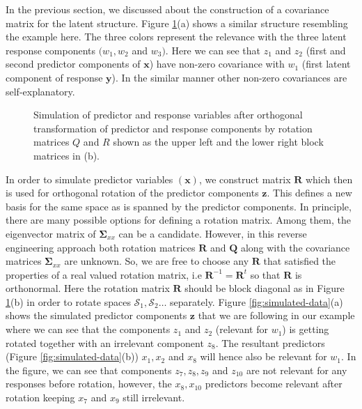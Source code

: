 \documentclass[review]{elsarticle}
\theoremstyle{definition}
\theoremstyle{definition}
\theoremstyle{remark}
\begin{document}
In the previous section, we discussed about the construction of a
covariance matrix for the latent structure. Figure
\ref{fig:cov-plot-print}(a) shows a similar structure resembling the
example here. The three colors represent the relevance with the three
latent response components \((w_1, w_2\) and \(w_3)\). Here we can see
that \(z_{1}\) and \(z_{2}\) (first and second predictor components of
\(\mathbf{x}\)) have non-zero covariance with \(w_1\) (first latent
component of response \(\mathbf{y}\)). In the similar manner other
non-zero covariances are self-explanatory.

\begin{figure}[!htb]
\caption{Simulation of predictor and response variables after orthogonal transformation of predictor and response components by rotation matrices $Q$ and $R$ shown as the upper left and the lower right block matrices in (b).}\label{fig:cov-plot-print}
\end{figure}

In order to simulate predictor variables \((\mathbf{x})\), we construct
matrix \(\mathbf{R}\) which then is used for orthogonal rotation of the
predictor components \(\mathbf{z}\). This defines a new basis for the
same space as is spanned by the predictor components. In principle,
there are many possible options for defining a rotation matrix. Among
them, the eigenvector matrix of \(\boldsymbol{\Sigma}_{xx}\) can be a
candidate. However, in this reverse engineering approach both rotation
matrices \(\mathbf{R}\) and \(\mathbf{Q}\) along with the covariance
matrices \(\boldsymbol{\Sigma}_{xx}\) are unknown. So, we are free to
choose any \(\mathbf{R}\) that satisfied the properties of a real valued
rotation matrix, i.e \(\mathbf{R}^{-1} = \mathbf{R}^t\) so that
\(\mathbf{R}\) is orthonormal. Here the rotation matrix \(\mathbf{R}\)
should be block diagonal as in Figure \ref{fig:cov-plot-print}(b) in
order to rotate spaces \(\mathcal{S}_1, \mathcal{S}_2 \ldots\)
separately. Figure \ref{fig:simulated-data}(a) shows the simulated
predictor components \(\mathbf{z}\) that we are following in our example
where we can see that the components \(z_{1}\) and \(z_{2}\) (relevant
for \(w_1\)) is getting rotated together with an irrelevant component
\(z_{8}\). The resultant predictors (Figure \ref{fig:simulated-data}(b))
\(x_{1}, x_{2}\) and \(x_{8}\) will hence also be relevant for \(w_1\).
In the figure, we can see that components \(z_{7}, z_{8}, z_{9}\) and
\(z_{10}\) are not relevant for any responses before rotation, however,
the \(x_{8}, x_{10}\) predictors become relevant after rotation keeping
\(x_{7}\) and \(x_{9}\) still irrelevant.
\end{document}

